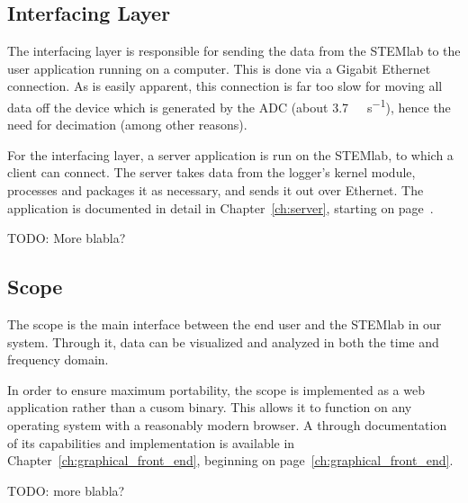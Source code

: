 \subsection{Interfacing Layer} %
\label{subsec:concept:interfacing_layer}

The interfacing layer is responsible for  sending the data from the STEMlab to
the  user application  running  on  a computer. This  is  done  via a  Gigabit
Ethernet connection. As  is easily apparent,  this connection is far  too slow
for  moving all  data off  the device  which is  generated by  the ADC  (about
\SI{3.7}{\gibi\byte\per\second}), hence  the need for decimation  (among other
reasons).

For the  interfacing layer,  a server  application is run  on the  STEMlab, to
which a  client can connect. The  server takes  data from the  logger's kernel
module,  processes  and packages  it  as  necessary,  and  sends it  out  over
Ethernet.  The application is documented in detail in Chapter~\ref{ch:server},
starting on page~\pageref{ch:server}.

TODO: More blabla?

\subsection{Scope} %
\label{subsec:concept:scope}

The scope is the main interface between the end user and the STEMlab in our
system. Through it, data can be visualized and analyzed in both the time and
frequency domain.

In  order  to  ensure  maximum   portability,  the  scope  is  implemented  as
a   web   application   rather   than   a   cusom   binary. This   allows   it
to   function   on   any   operating   system   with   a   reasonably   modern
browser. A  through  documentation  of  its  capabilities  and  implementation
is   available    in   Chapter~\ref{ch:graphical_front_end},    beginning   on
page~\ref{ch:graphical_front_end}.

TODO: more blabla?


